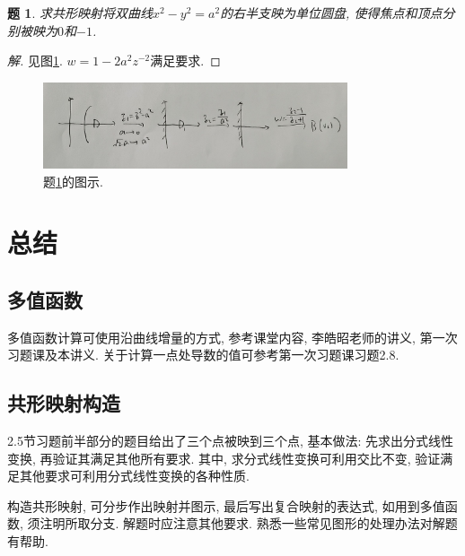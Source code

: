\documentclass{article}[a4paper, 12pt]
\newtheorem{problem}{题}
\newenvironment{solution}{\begin{proof}[解]}{\end{proof}}
\begin{document}
\begin{problem}\label{supp1}
  求共形映射将双曲线\(x^2-y^2=a^2\)的右半支映为单位圆盘, 使得焦点和顶点分别被映为\(0\)和\(-1\).
\end{problem}

\begin{solution}
  见图\ref{fig:supp1}. \(w=1-2a^2z^{-2}\)满足要求.
\end{solution}

\begin{figure}[htbp]
  \centering
  \includegraphics[width=0.8\textwidth]{images/supp1.jpg}
  \caption{题\ref{supp1}的图示.}
  \label{fig:supp1}
\end{figure}

\section{总结}

\subsection{多值函数}

多值函数计算可使用沿曲线增量的方式, 参考课堂内容, 李皓昭老师的讲义, 第一次习题课及本讲义. 关于计算一点处导数的值可参考第一次习题课习题2.8.

\subsection{共形映射构造}

2.5节习题前半部分的题目给出了三个点被映到三个点, 基本做法: 先求出分式线性变换, 再验证其满足其他所有要求. 其中, 求分式线性变换可利用交比不变, 验证满足其他要求可利用分式线性变换的各种性质.

构造共形映射, 可分步作出映射并图示, 最后写出复合映射的表达式, 如用到多值函数, 须注明所取分支. 解题时应注意其他要求. 熟悉一些常见图形的处理办法对解题有帮助.
\end{document}
